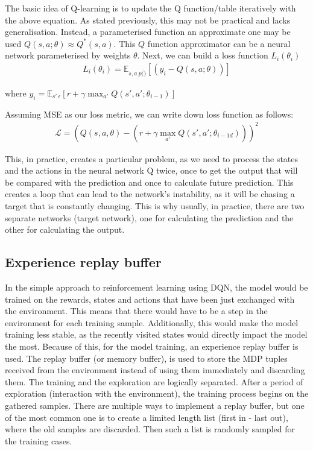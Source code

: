 The basic idea of Q-learning is to update the Q function/table iteratively with the above equation.
As stated previously, this may not be practical and lacks generalisation.
Instead, a parameterised function an approximate one may be used $Q(s,a;\theta) \approx Q^{*}(s,a)$.
This $Q$ function approximator can be a neural network parameterised by weights $\theta$.
Next, we can build a loss function $L_{i}(\theta_{i})$
\begin{align}
L_{i}(\theta_{i}) = \mathbb{E}_{s,a~p(\dot)}\left[(y_{i} - Q(s,a;\theta))\right]
\end{align}

where $y_{i} = \mathbb{E}_{s'~\epsilon}\left[r+\gamma \max_{a'}Q(s',a';\theta_{i-1})\right]$

Assuming MSE as our loss metric, we can write down loss function as follows:
\begin{align}
\mathcal{L} = (Q(s,a,\theta) - (r+\gamma\max_{a'}Q(s',a';\theta_{i-1d})))^{2}
\end{align}

This, in practice, creates a particular problem, as we need to process the states and the actions in the neural network Q twice, once to get the output that will be compared with the prediction and once to calculate future prediction. This creates a loop that can lead to the network's instability, as it will be chasing a target that is constantly changing. This is why usually, in practice, there are two separate networks (target network), one for calculating the prediction and the other for calculating the output.

\subsection{Experience replay buffer}

In the simple approach to reinforcement learning using DQN, the model would be trained on the rewards, states and actions that have been just exchanged with the environment.
This means that there would have to be a step in the environment for each training sample.
Additionally, this would make the model training less stable, as the recently visited states would directly impact the model the most.
Because of this, for the model training, an experience replay buffer is used.
The replay buffer (or memory buffer), is used to store the MDP tuples received from the environment instead of using them immediately and discarding them.
The training and the exploration are logically separated.
After a period of exploration (interaction with the environment), the training process begins on the gathered samples.
There are multiple ways to implement a replay buffer, but one of the most common one is to create a limited length list (first in - last out), where the old samples are discarded.
Then such a list is randomly sampled for the training cases.


